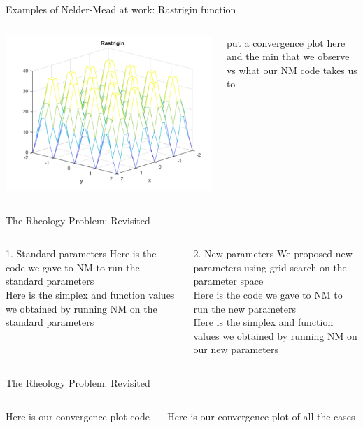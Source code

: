 \documentclass{beamer}
\begin{document}
\begin{frame}{Examples of Nelder-Mead at work: Rastrigin function}
\begin{columns}
\begin{column}{0.4\linewidth}
	\includegraphics[width=0.95\linewidth]{rastriginPlot}	
\end{column}
\begin{column}{0.58\linewidth}
	put a convergence plot here and the min that we observe vs what our NM code takes us to
\end{column}
\end{columns}
\end{frame}


\begin{frame}{The Rheology Problem: Revisited}
	\begin{columns}
	\begin{column}{0.49\linewidth}
	\begin{block}{1. Standard parameters}
		Here is the code we gave to NM to run the standard parameters\\
		Here is the simplex and function values we obtained by running NM on the standard parameters
	\end{block}
	\end{column}
	\begin{column}{0.49\linewidth}
	\begin{block}{2. New parameters}
		We proposed new parameters using grid search on the parameter space\\
		Here is the code we gave to NM to run the new parameters\\
		Here is the simplex and function values we obtained by running NM on our new parameters
	\end{block}
	\end{column}
	\end{columns}
\end{frame}

\begin{frame}{The Rheology Problem: Revisited}
	\begin{columns}
	\begin{column}{0.39\linewidth}
		\centering
		Here is our convergence plot code
	\end{column}
	\begin{column}{0.59\linewidth}
		\centering
		Here is our convergence plot of all the cases
	\end{column}
	\end{columns}
\end{frame}
\end{document}
